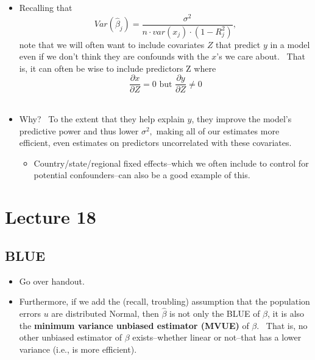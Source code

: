 \documentclass[11pt]{article}
\begin{document}
\begin{itemize}
\item Recalling that%
\begin{equation*}
Var\left( \widehat{\beta }_{j}\right) =\frac{\sigma ^{2}}{n\cdot
var(x_{j})\cdot \left( 1-R_{j}^{2}\right) },
\end{equation*}
note that we will often want to include covariates $Z$ that predict $y$ in a
model even if we don't think they are confounds with the $x$'s we care
about. \ That is, it can often be wise to include predictors Z where%
\begin{equation*}
\frac{\partial x}{\partial Z}=0\text{ but }\frac{\partial y}{\partial Z}\neq
0
\end{equation*}
\ 

\item Why? \ To the extent that they help explain $y$, they improve the
model's predictive power and thus lower $\sigma ^{2},$ making all of our
estimates more efficient, even estimates on predictors uncorrelated with
these covariates.

\begin{itemize}
\item Country/state/regional fixed effects--which we often include to
control for potential confounders--can also be a good example of this.
\end{itemize}
\end{itemize}

\section{Lecture 18}

\subsection{BLUE}

\begin{itemize}
\item Go over handout.

\item Furthermore, if we add the (recall, troubling) assumption that the
population errors $u$ are distributed Normal, then $\widehat{\beta }$ is not
only the BLUE of $\beta $, it is also the \textbf{minimum variance unbiased
estimator (MVUE) }of $\beta $. \ That is, no other unbiased estimator of $%
\beta $ exists--whether linear or not--that has a lower variance (i.e., is
more efficient)$.$
\end{itemize}
\end{document}
